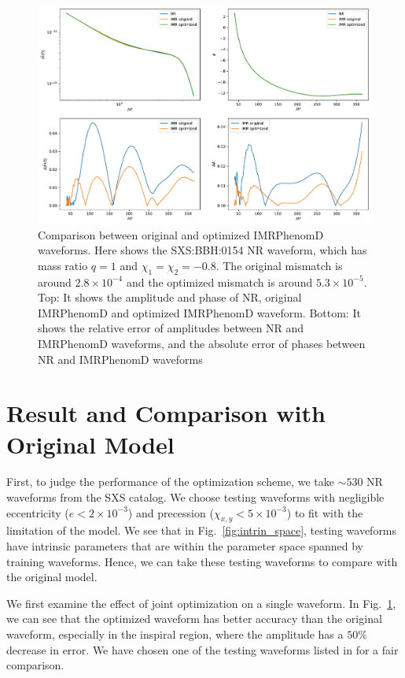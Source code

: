 \documentclass[twocolumn]{aastex631}
\begin{document}
\begin{figure}[t]
	\centering
	\includegraphics[width=\textwidth]{../static/0154_waveform_comparison.pdf}
	\caption{Comparison between original and optimized IMRPhenomD waveforms. Here shows the SXS:BBH:0154 NR waveform, which has mass ratio $q=1$ and $\chi_1=\chi_2=-0.8$. The original mismatch is around $2.8\times10^{-4}$ and the optimized mismatch is around $5.3\times10^{-5}$. Top: It shows the amplitude and phase of NR, original IMRPhenomD and optimized IMRPhenomD waveform. Bottom: It shows the relative error of amplitudes between NR and IMRPhenomD waveforms, and the absolute error of phases between NR and IMRPhenomD waveforms}
	\label{fig:0154}
\end{figure}

\section{Result and Comparison with Original Model} \label{sec:result}

First, to judge the performance of the optimization scheme, we take $\sim530$ NR waveforms from the SXS catalog. We choose testing waveforms with negligible eccentricity (${e<2\times10^{-3}}$) and precession (${\chi_{x,y}<5\times10^{-3}}$) to fit with the limitation of the model. We see that in Fig.~\ref{fig:intrin_space}, testing waveforms have intrinsic parameters that are within the parameter space spanned by training waveforms. Hence, we can take these testing waveforms to compare with the original model. 

We first examine the effect of joint optimization on a single waveform. In Fig.~\ref{fig:0154}, we can see that the optimized waveform has better accuracy than the original waveform, especially in the inspiral region, where the amplitude has a $50\%$ decrease in error. We have chosen one of the testing waveforms listed in \cite{khan2016frequency} for a fair comparison. 
\end{document}
